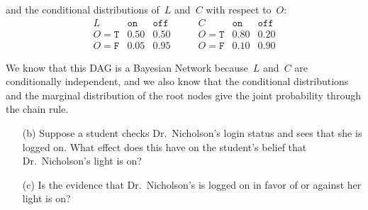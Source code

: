 \documentclass[a4paper]{article}
\begin{document}
and the conditional distributions of~\(L\) and~\(C\) with respect to~\(O\):
\[
    \begin{array}{c|cc}
        L              & \texttt{on} & \texttt{off} \\ \hline
        O = \texttt{T} & 0.50        & 0.50 \\
        O = \texttt{F} & 0.05        & 0.95
    \end{array}
    \qquad
    \begin{array}{c|cc}
        C              & \texttt{on} & \texttt{off} \\ \hline
        O = \texttt{T} & 0.80        & 0.20 \\
        O = \texttt{F} & 0.10        & 0.90
    \end{array}
\]

We know that this DAG is a Bayesian Network because~\(L\) and~\(C\) are
conditionally independent, and we also know that the conditional distributions
and the marginal distribution of the root nodes give the joint probability
through the chain rule.

\begin{enumerate}
    \item[(b)] Suppose a student checks Dr.\ Nicholson's login status and sees
        that she is logged on. What effect does this have on the student's
        belief that Dr.\ Nicholson's light is on?
\end{enumerate}

\begin{enumerate}
    \item[(c)] Is the evidence that Dr.\ Nicholson's is logged on in favor of or
        against her light is on?
\end{enumerate}
\end{document}
